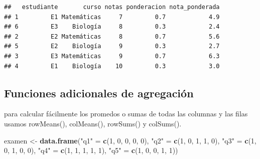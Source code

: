 \documentclass[
]{book}
\newenvironment{Shaded}{\begin{snugshade}}{\end{snugshade}}
\newcommand{\DecValTok}[1]{\textcolor[rgb]{0.00,0.00,0.81}{#1}}
\newcommand{\FunctionTok}[1]{\textcolor[rgb]{0.13,0.29,0.53}{\textbf{#1}}}
\newcommand{\NormalTok}[1]{#1}
\newcommand{\OtherTok}[1]{\textcolor[rgb]{0.56,0.35,0.01}{#1}}
\newcommand{\SpecialCharTok}[1]{\textcolor[rgb]{0.81,0.36,0.00}{\textbf{#1}}}
\newcommand{\StringTok}[1]{\textcolor[rgb]{0.31,0.60,0.02}{#1}}
\begin{document}
\begin{Shaded}
\end{Shaded}

\begin{verbatim}
##   estudiante       curso notas ponderacion nota_ponderada
## 1         E1 Matemáticas     7         0.7            4.9
## 6         E3    Biología     8         0.3            2.4
## 2         E2 Matemáticas     8         0.7            5.6
## 5         E2    Biología     9         0.3            2.7
## 3         E3 Matemáticas     9         0.7            6.3
## 4         E1    Biología    10         0.3            3.0
\end{verbatim}

\subsection{Funciones adicionales de agregación}\label{funciones-adicionales-de-agregaciuxf3n}

para calcular fácilmente los promedos o sumas de todas las columnas y las filas usamos rowMeans(), colMeans(), rowSums() y colSums().

\begin{Shaded}
\begin{Highlighting}[]
\NormalTok{examen }\OtherTok{\textless{}{-}} \FunctionTok{data.frame}\NormalTok{(}\StringTok{"q1"} \OtherTok{=} \FunctionTok{c}\NormalTok{(}\DecValTok{1}\NormalTok{, }\DecValTok{0}\NormalTok{, }\DecValTok{0}\NormalTok{, }\DecValTok{0}\NormalTok{, }\DecValTok{0}\NormalTok{),}
                     \StringTok{"q2"} \OtherTok{=} \FunctionTok{c}\NormalTok{(}\DecValTok{1}\NormalTok{, }\DecValTok{0}\NormalTok{, }\DecValTok{1}\NormalTok{, }\DecValTok{1}\NormalTok{, }\DecValTok{0}\NormalTok{),}
                     \StringTok{"q3"} \OtherTok{=} \FunctionTok{c}\NormalTok{(}\DecValTok{1}\NormalTok{, }\DecValTok{0}\NormalTok{, }\DecValTok{1}\NormalTok{, }\DecValTok{0}\NormalTok{, }\DecValTok{0}\NormalTok{),}
                     \StringTok{"q4"} \OtherTok{=} \FunctionTok{c}\NormalTok{(}\DecValTok{1}\NormalTok{, }\DecValTok{1}\NormalTok{, }\DecValTok{1}\NormalTok{, }\DecValTok{1}\NormalTok{, }\DecValTok{1}\NormalTok{),}
                     \StringTok{"q5"} \OtherTok{=} \FunctionTok{c}\NormalTok{(}\DecValTok{1}\NormalTok{, }\DecValTok{0}\NormalTok{, }\DecValTok{0}\NormalTok{, }\DecValTok{1}\NormalTok{, }\DecValTok{1}\NormalTok{))}
\end{Highlighting}
\end{Shaded}
\end{document}
